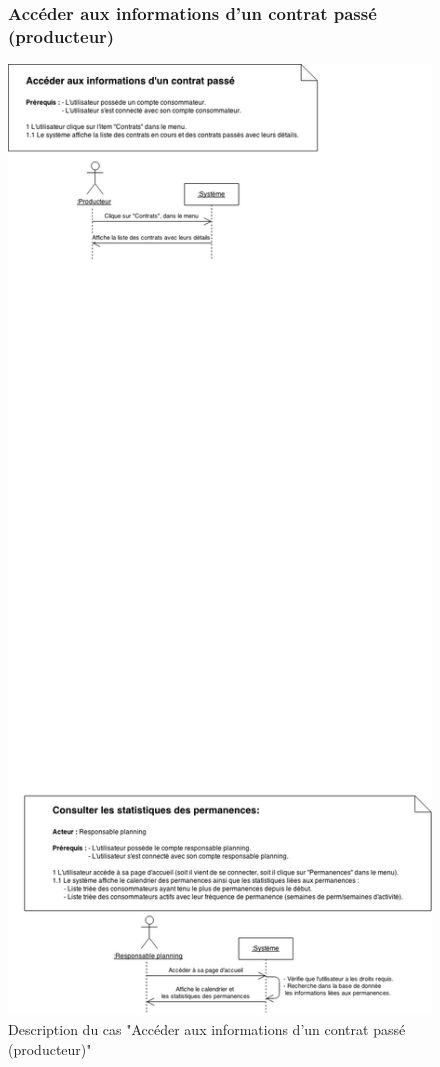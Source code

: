 \documentclass[12pt]{report}
\begin{document}
\begin{figure}[!h]
\centering
\subsubsection{Accéder aux informations d'un contrat passé (producteur)~~~~~~~~~~~~~~~~~~~~~~~~~~~}
\includegraphics[width=1.\textwidth]{./ressources/desc_UC_contrats_passes.png}
\caption{Description du cas "Accéder aux informations d'un contrat passé (producteur)"}
\end{figure}
\clearpage
\end{document}
